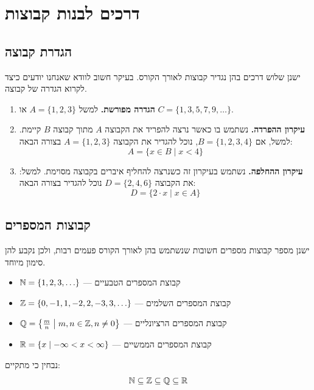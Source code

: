 \section{דרכים לבנות קבוצות}
\subsection{הגדרת קבוצה}
ישנן שלוש דרכים בהן נגדיר קבוצות לאורך הקורס. בעיקר חשוב לוודא שאנחנו יודעים כיצד לקרוא הגדרה של קבוצה.
\begin{enumerate}
    \item \textbf{הגדרה מפורשת.} למשל $A = \{1, 2, 3\}$ או $C = \{1, 3, 5, 7, 9, \ldots\}$.
    \item \textbf{עיקרון ההפרדה.} נשתמש בו כאשר נרצה להפריד את הקבוצה $A$ מתוך קבוצה $B$ קיימת. למשל, אם $B = \{1, 2, 3, 4\}$, נוכל להגדיר את הקבוצה $A = \{1, 2, 3\}$ בצורה הבאה:
    \[
        A = \{x \in B \mid x < 4\}
    \]
    \item \textbf{עיקרון ההחלפה.} נשתמש בעיקרון זה כשנרצה להחליף איברים בקבוצה מסוימת. למשל: את הקבוצה $D = \{2, 4, 6\}$ נוכל להגדיר בצורה הבאה:
    \[
        D = \{2 \cdot x \mid x \in A\}
    \]
\end{enumerate}

\subsection{קבוצות המספרים}
ישנן מספר קבוצות מספרים חשובות שנשתמש בהן לאורך הקורס פעמים רבות, ולכן נקבע להן סימון מיוחד.
\begin{itemize}
    \item $\mathbb{N} = \{1, 2, 3, \ldots\}$ --- קבוצת המספרים הטבעיים
    \item $\mathbb{Z} = \{0, -1, 1, -2, 2, -3, 3, \ldots\}$ --- קבוצת המספרים השלמים
    \item $\mathbb{Q} = \left\{ \frac{m}{n} \;\middle|\; m, n \in \mathbb{Z}, n \neq 0 \right\}$ --- קבוצת המספרים הרציונליים
    \item $\mathbb{R} = \{x \mid -\infty < x < \infty\}$ --- קבוצת המספרים הממשיים
\end{itemize}
נבחין כי מתקיים:
\[
    \mathbb{N} \subseteq \mathbb{Z} \subseteq \mathbb{Q} \subseteq \mathbb{R}
\]

